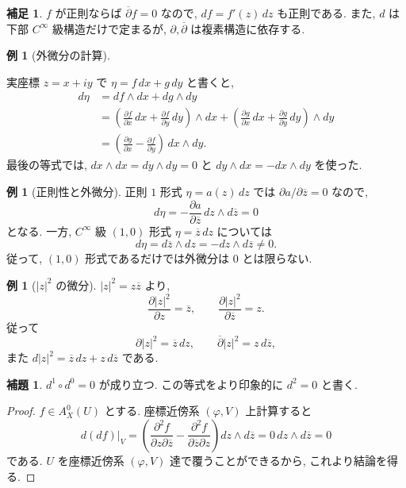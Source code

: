 \documentclass[dvipdfmx,a4paper,11pt]{article} %
\theoremstyle{definition}
\numberwithin{equation}{section}
\newtheorem{lem}[thm]{補題}
\newtheorem{rem}[thm]{補足}
\newtheorem{exa}[thm]{例}
\begin{document}
\begin{rem}
$f$ が正則ならば $\overline\partial f=0$ なので, 
$df=f'(z)\,dz$ も正則である.
また, $d$ は下部 $C^\infty$ 級構造だけで定まるが, 
$\partial,\overline\partial$ は複素構造に依存する.
\end{rem}

\begin{exa}[外微分の計算]\label{O-M102}


実座標 $z=x+iy$ で $\eta=f\,dx+g\,dy$ と書くと, 
\[
\begin{aligned}
d\eta
&=df\wedge dx+dg\wedge dy\\
&=(\frac{\partial f}{\partial x}\,dx+\frac{\partial f}{\partial y}\,dy)\wedge dx
 +(\frac{\partial g}{\partial x}\,dx+\frac{\partial g}{\partial y}\,dy)\wedge dy\\
&=(\frac{\partial g}{\partial x}-\frac{\partial f}{\partial y})\,dx\wedge dy.
\end{aligned}
\]
最後の等式では, $dx\wedge dx=dy\wedge dy=0$ と
$dy\wedge dx=-dx\wedge dy$ を使った.

\end{exa}

\begin{exa}[正則性と外微分]
正則 $1$ 形式 $\eta=a(z)\,dz$ では
$\partial a/\partial\overline z=0$ なので, 
\[
d\eta=-\frac{\partial a}{\partial\overline z}
\,dz\wedge d\overline z=0
\]
となる.
一方, $C^\infty$ 級 $(1,0)$ 形式
$\eta=\overline z\,dz$ については
\[
d\eta=d\overline z\wedge dz
=-dz\wedge d\overline z\neq0.
\]
従って, $(1,0)$ 形式であるだけでは外微分は $0$ とは限らない.

\end{exa}

\begin{exa}[$|z|^2$ の微分]
$|z|^2=z\overline z$ より, 
\[
\frac{\partial |z|^2}{\partial z}=\overline z,\qquad
\frac{\partial |z|^2}{\partial\overline z}=z.
\]
従って
\[
\partial|z|^2=\overline z\,dz,\qquad
\overline\partial|z|^2=z\,d\overline z,
\]
また $d|z|^2=\overline z\,dz+z\,d\overline z$ である.

\end{exa}


\begin{lem}\label{O-M103}
$d^1\circ d^0=0$ が成り立つ. この等式をより印象的に $d^2=0$ と書く.
\end{lem}

\begin{proof}
$f\in A_X^0(U)$ とする. 座標近傍系 $(\varphi,V)$ 上計算すると
\[
d(df)|_V=
\left(
\frac{\partial^2 f}{\partial z\partial\overline z}
-
\frac{\partial^2 f}{\partial\overline z\partial z}
\right)dz\wedge d\overline z
=
0\,dz\wedge d\overline z=0
\]
である. $U$ を座標近傍系 $(\varphi,V)$ 達で覆うことができるから, これより結論を得る.
\end{proof}
\end{document}
